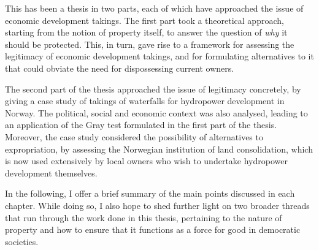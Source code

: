 This has been a thesis in two parts, each of which have approached the issue of economic development takings. The first part took a theoretical approach, starting from the notion of property itself, to answer the question of {\it why} it should be protected. This, in turn, gave rise to a framework for assessing the legitimacy of economic development takings, and for formulating alternatives to it that could obviate the need for dispossessing current owners.

The second part of the thesis approached the issue of legitimacy concretely, by giving a case study of takings of waterfalls for hydropower development in Norway. The political, social and economic context was also analysed, leading to an application of the Gray test formulated in the first part of the thesis. Moreover, the case study considered the possibility of alternatives to expropriation, by assessing the Norwegian institution of land consolidation, which is now used extensively by local owners who wish to undertake hydropower development themselves.




In the following, I offer a brief summary of the main points discussed in each chapter. While doing so, I also hope to shed further light on two broader threads that run through the work done in this thesis, pertaining to the nature of property and how to ensure that it functions as a force for good in democratic societies.

